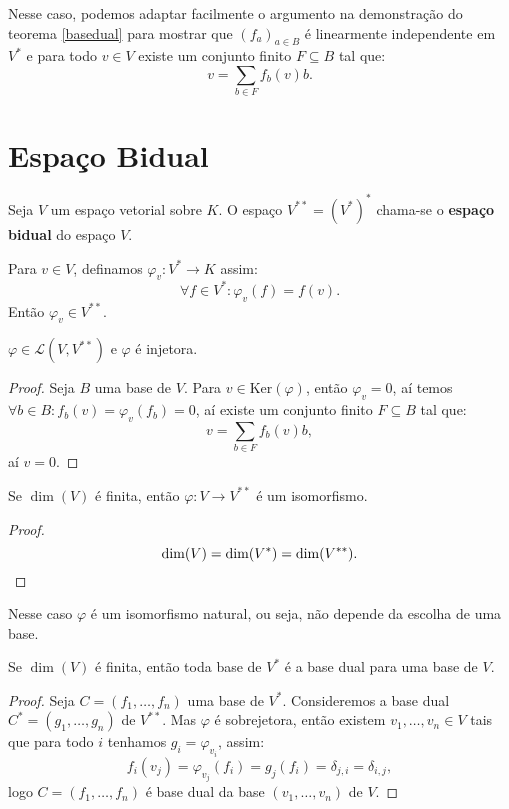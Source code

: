\documentclass[11pt,twoside,a4paper]{book}
\begin{document}
\noindent
Nesse caso, podemos adaptar facilmente o argumento na demonstração do teorema \ref{basedual} para mostrar que $(f_a)_{a\in B}$ é linearmente independente em $V^*$ e para todo $v\in V$ existe um conjunto finito $F\subseteq B$ tal que:
\[
v=\sum_{b\in F}f_b(v)b.
\]

\section{Espaço Bidual}

\begin{definicao}
Seja $V$ um espaço vetorial sobre $K$. O espaço $V^{**}=(V^*)^*$ chama-se o \textbf{espaço bidual} do espaço $V$.
\end{definicao}

\begin{definicao}
Para $v\in V$, definamos $\varphi_v:V^*\rightarrow K$ assim:
\[
\forall f\in V^*:\varphi_v(f)=f(v).
\]
Então $\varphi_v\in V^{**}$.
\end{definicao}

\begin{proposicao}
$\varphi\in\mathcal{L}(V,V^{**})$ e $\varphi$ é injetora.
\end{proposicao}
\begin{proof}
Seja $B$ uma base de $V$. Para $v\in\mathrm{Ker}(\varphi)$, então $\varphi_v=0$, aí temos $\forall b\in B:f_b(v)=\varphi_v(f_b)=0$, aí existe um conjunto finito $F\subseteq B$ tal que:
\[
v=\sum_{b\in F}f_b(v)b,
\]
aí $v=0$.
\end{proof}

\begin{corolario}
Se $\dim(V)$ é finita, então $\varphi:V\rightarrow V^{**}$ é um isomorfismo.
\end{corolario}
\begin{proof}
\[
\dim(V)=\dim(V^*)=\dim(V^{**}). \qedhere
\]
\end{proof}

\begin{observacao}
Nesse caso $\varphi$ é um isomorfismo natural, ou seja, não depende da escolha de uma base.
\end{observacao}

\begin{corolario}
Se $\dim(V)$ é finita, então toda base de $V^*$ é a base dual para uma base de $V$.
\end{corolario}
\begin{proof}
Seja $C=(f_1,\dots,f_n)$ uma base de $V^*$. Consideremos a base dual $C^*=(g_1,\dots,g_n)$ de $V^{**}$. Mas $\varphi$ é sobrejetora, então existem $v_1,\dots,v_n\in V$ tais que para todo $i$ tenhamos $g_i=\varphi_{v_i}$, assim:
\[
f_i(v_j)=\varphi_{v_j}(f_i)=g_j(f_i)=\delta_{j,i}=\delta_{i,j},
\]
logo $C=(f_1,\dots,f_n)$ é base dual da base $(v_1,\dots,v_n)$ de $V$.
\end{proof}
\end{document}
